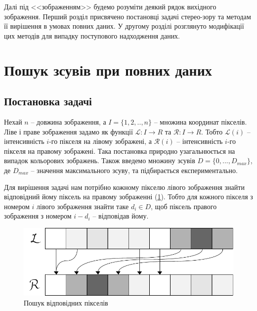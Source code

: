 \documentclass{ConfFTI}
\begin{document}
Далі під <<зображенням>> будемо розуміти деякий рядок вихідного зображення.
Перший розділ присвячено постановці задачі стерео-зору та методам її вирішення в умовах повних даних. У другому розділі розглянуто модифікації цих методів для випадку поступового надходження даних.


\section{Пошук зсувів при повних даних} \label{sec1}

\subsection{Постановка задачі} 
	Нехай $ n $ -- довжина зображення, а $I = \{1, 2, .., n\}$ -- множина координат пікселів. Ліве і праве зображення задамо як функції $ \mathcal{L} : I \rightarrow R $ та $ \mathcal{R} : I \rightarrow R $. Тобто $\mathcal{L}(i)$ -- інтенсивність $i$-го пікселя на лівому зображені, а $\mathcal{R}(i)$ -- інтенсивність $i$-го пікселя на правому зображені. Така постановка природно узагальнюється на випадок кольорових зображень. Також введемо множину зсувів $D = \{0, ... , D_{max}\}$, де $D_{max}$ -- значення максимального зсуву, та підбирається експериментально.

Для вирішення задачі нам потрібно кожному пікселю лівого зображення знайти відповідний йому піксель на правому зображенні (\ref{mapping}). Тобто для кожного пікселя з номером $i$ лівого зображення знайти таке $ d_i \in D$, щоб піксель правого зображення  з номером $i - d_i$ -- відповідав йому.
\begin{figure}[h!]
	\centering
	\includegraphics[scale = 0.5]{mapping.pdf}
	\caption{Пошук відповідних пікселів}
	\label{mapping}
\end{figure}
\end{document}
